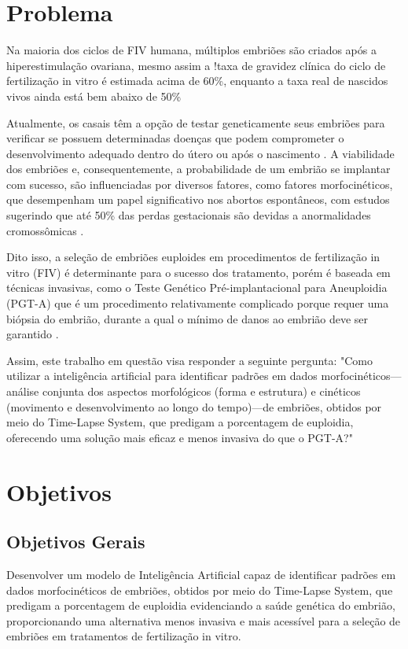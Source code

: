 \section{Problema}

Na maioria dos ciclos de FIV humana, múltiplos embriões são criados após a hiperestimulação ovariana, mesmo assim a !taxa de gravidez clínica do ciclo de fertilização in vitro é estimada acima de 60\%, enquanto a taxa real de nascidos vivos ainda está bem abaixo de 50\% \cite{salame2024} 

Atualmente, os casais têm a opção de testar geneticamente seus embriões para verificar se possuem determinadas doenças que podem comprometer o desenvolvimento adequado dentro do útero ou após o nascimento \cite{scienceofbiogenetics2024}. A viabilidade dos embriões e, consequentemente, a probabilidade de um embrião se implantar com sucesso, são influenciadas por diversos fatores, como fatores morfocinéticos, que desempenham um papel significativo nos abortos espontâneos, com estudos sugerindo que até 50\% das perdas gestacionais são devidas a anormalidades cromossômicas \cite{scienceofbiogenetics2024}. 

Dito isso, a seleção de embriões euploides em procedimentos de fertilização in vitro (FIV) é determinante para o sucesso dos tratamento, porém é baseada em técnicas invasivas, como o Teste Genético Pré-implantacional para Aneuploidia (PGT-A) que é um procedimento relativamente complicado porque requer uma biópsia do embrião, durante a qual o mínimo de danos ao embrião deve ser garantido \cite{yang2024}. 

Assim, este trabalho em questão visa responder a seguinte pergunta: "Como utilizar a inteligência artificial para identificar padrões em dados morfocinéticos—análise conjunta dos aspectos morfológicos (forma e estrutura) e cinéticos (movimento e desenvolvimento ao longo do tempo)—de embriões, obtidos por meio do Time-Lapse System, que predigam a porcentagem de euploidia, oferecendo uma solução mais eficaz e menos invasiva do que o PGT-A?"


\section{Objetivos}

\subsection{Objetivos Gerais}
Desenvolver um modelo de Inteligência Artificial capaz de identificar padrões em dados morfocinéticos de embriões, obtidos por meio do Time-Lapse System, que predigam a porcentagem de euploidia evidenciando a saúde genética do embrião, proporcionando uma alternativa menos invasiva e mais acessível para a seleção de embriões em tratamentos de fertilização in vitro.

